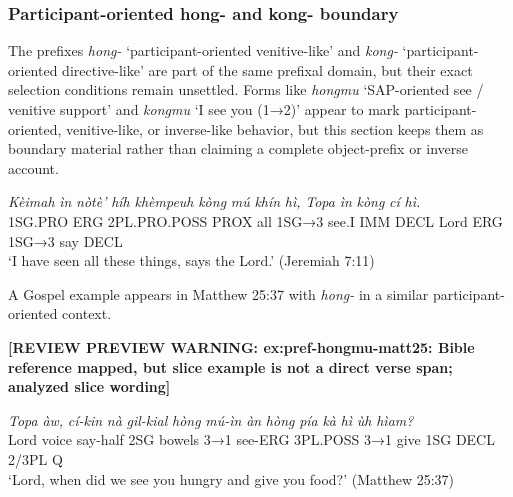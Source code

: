 \documentclass[
  11pt,
  a4paper,
]{article}
\newcommand{\tdim}[1]{\textit{#1}}
\newcommand{\tdimword}[1]{\textit{#1}}
\renewcommand{\textsc}[1]{{\footnotesize\MakeUppercase{#1}}}
\newcommand{\glossquote}[1]{`#1'}
\newcommand{\reviewwarninginline}[1]{\textbf{#1}\par\smallskip}
\begin{document}
\subsubsection{Participant-oriented hong- and kong-
boundary}\label{participant-oriented-hong--and-kong--boundary-1}

The prefixes \tdim{hong-}
\glossquote{participant-oriented venitive-like} and \tdim{kong-}
\glossquote{participant-oriented directive-like} are part of the same
prefixal domain, but their exact selection conditions remain unsettled.
Forms like \tdim{hongmu}
\glossquote{SAP-oriented see / venitive support} and \tdim{kongmu}
\glossquote{I see you (1→2)} appear to mark participant-oriented,
venitive-like, or inverse-like behavior, but this section keeps them as
boundary material rather than claiming a complete object-prefix or
inverse account.

\begin{exe}
\ex \label{ex:pref-kongmu-jer7}
\gll \tdimword{Kèimah} \tdimword{ìn} \tdimword{nòtè'} \tdimword{híh} \tdimword{khèmpeuh} \tdimword{kòng} \tdimword{mú} \tdimword{khín} \tdimword{hì,} \tdimword{Topa} \tdimword{ìn} \tdimword{kòng} \tdimword{cí} \tdimword{hì.} \\
     \textsc{1sg}.\textsc{pro} \textsc{erg} \textsc{2pl}.\textsc{pro}.\textsc{poss} \textsc{prox} all \textsc{1sg→3} see.\textsc{i} \textsc{imm} \textsc{decl} Lord \textsc{erg} \textsc{1sg→3} say \textsc{decl} \\
\glt \glossquote{I have seen all these things, says the Lord.} (Jeremiah 7:11)
\end{exe}

A Gospel example appears in Matthew 25:37 with \tdim{hong-} in a similar
participant-oriented context.

\begin{exe}
\ex \label{ex:pref-hongmu-matt25}
\reviewwarninginline{[REVIEW PREVIEW WARNING: ex:pref-hongmu-matt25: Bible reference mapped, but slice example is not a direct verse span; analyzed slice wording]}
\gll \tdimword{Topa} \tdimword{àw,} \tdimword{cí-kin} \tdimword{nà} \tdimword{gil-kial} \tdimword{hòng} \tdimword{mú-ìn} \tdimword{àn} \tdimword{hòng} \tdimword{pía} \tdimword{kà} \tdimword{hì} \tdimword{ùh} \tdimword{hìam?} \\
     Lord voice say-half \textsc{2sg} bowels \textsc{3→1} see-\textsc{erg} \textsc{3pl}.\textsc{poss} \textsc{3→1} give \textsc{1sg} \textsc{decl} 2/3PL \textsc{q} \\
\glt \glossquote{Lord, when did we see you hungry and give you food?} (Matthew 25:37)
\end{exe}
\end{document}
